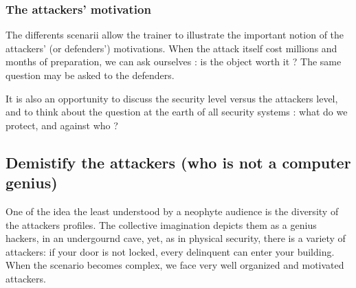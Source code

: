 \documentclass[11pt]{article} %
\begin{document}
\subsubsection{The attackers' motivation}
The differents scenarii allow the trainer to illustrate the important notion of the 
attackers' (or defenders') motivations. When the attack itself cost millions and months of 
preparation, we can ask ourselves : is the object worth it ?
The same question may be asked to the defenders.

It is also an opportunity to discuss the security level versus the attackers level, and to 
think about the question at the earth of all security systems : 
what do we protect, and against who ?

\subsection{Demistify the attackers (who is not a computer genius)}
One of the idea the least understood by a neophyte audience is the diversity 
of the attackers profiles. The collective imagination depicts them as a genius hackers, 
in an undergournd cave, yet, as in physical security, there is a variety of attackers:
if your door is not locked, every delinquent can enter your building. When the scenario
becomes complex, we face very well organized and motivated attackers.
\end{document}
